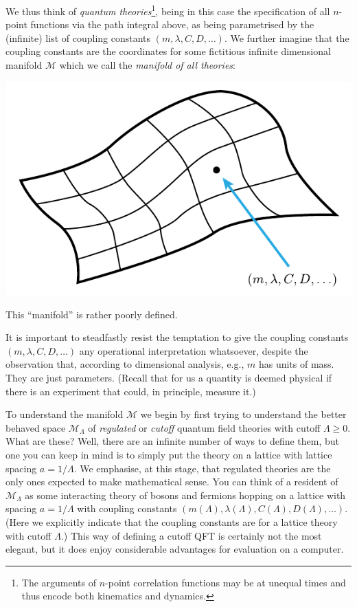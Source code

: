 \documentclass[11pt]{amsart}
\theoremstyle{plain}%
\theoremstyle{definition}
\theoremstyle{remark}
\begin{document}
We thus think of \emph{quantum theories}\footnote{The arguments of $n$-point correlation functions may be at unequal times and thus encode both kinematics and dynamics.}, being  in this case the specification of all $n$-point functions via the path integral above, as being parametrised by the (infinite) list of coupling constants $(m, \lambda, C, D, \ldots)$. We further imagine that the coupling constants are the coordinates for some fictitious infinite dimensional manifold $\mathcal{M}$ which we call the \emph{manifold of all theories}:
\begin{center}
	\includegraphics{manifold.pdf}
\end{center}
This ``manifold'' is rather poorly defined. 

It is important to steadfastly resist the temptation to give the coupling constants $(m, \lambda, C, D, \ldots)$ any operational interpretation whatsoever, despite the observation that, according to dimensional analysis, e.g., $m$ has units of mass. They are just parameters. (Recall that for us a quantity is deemed physical if there is an experiment that could, in principle, measure it.) 

To understand the manifold $\mathcal{M}$ we begin by first trying to understand the better behaved space $\mathcal{M}_{\Lambda}$ of \emph{regulated} or \emph{cutoff} quantum field theories with cutoff $\Lambda \ge 0$. What are these? Well, there are an infinite number of ways to define them, but one you can keep in mind is to simply put the theory on a lattice with lattice spacing $a = 1/\Lambda$. We emphasise, at this stage, that regulated theories are the only ones expected to make mathematical sense. You can think of a resident of $\mathcal{M}_{\Lambda}$  as some interacting theory of bosons and fermions hopping on a lattice with spacing $a=1/\Lambda$ with coupling constants $(m(\Lambda), \lambda(\Lambda), C(\Lambda), D(\Lambda), \ldots)$. (Here we explicitly indicate that the coupling constants are for a lattice theory with cutoff $\Lambda$.) This way of defining a cutoff QFT is certainly not the most elegant, but it does enjoy considerable advantages for evaluation on a computer. 
\end{document}
